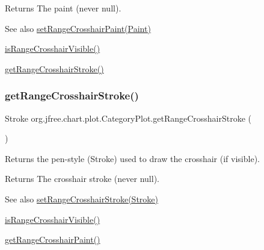 \begin{DoxyReturn}{Returns}
The paint (never {\ttfamily null}).
\end{DoxyReturn}
\begin{DoxySeeAlso}{See also}
\mbox{\hyperlink{classorg_1_1jfree_1_1chart_1_1plot_1_1_category_plot_abc74c7147d75331f023a571f8676e492}{set\+Range\+Crosshair\+Paint(\+Paint)}} 

\mbox{\hyperlink{classorg_1_1jfree_1_1chart_1_1plot_1_1_category_plot_ab7277c96161f03a087953b3313b39c47}{is\+Range\+Crosshair\+Visible()}} 

\mbox{\hyperlink{classorg_1_1jfree_1_1chart_1_1plot_1_1_category_plot_ace9c05d0aebbe5a5a97b1c0572c3ac83}{get\+Range\+Crosshair\+Stroke()}} 
\end{DoxySeeAlso}
\mbox{\label{classorg_1_1jfree_1_1chart_1_1plot_1_1_category_plot_ace9c05d0aebbe5a5a97b1c0572c3ac83}} 
\subsubsection{\texorpdfstring{get\+Range\+Crosshair\+Stroke()}{getRangeCrosshairStroke()}}
{\footnotesize\ttfamily Stroke org.\+jfree.\+chart.\+plot.\+Category\+Plot.\+get\+Range\+Crosshair\+Stroke (\begin{DoxyParamCaption}{ }\end{DoxyParamCaption})}

Returns the pen-\/style ({\ttfamily Stroke}) used to draw the crosshair (if visible).

\begin{DoxyReturn}{Returns}
The crosshair stroke (never {\ttfamily null}).
\end{DoxyReturn}
\begin{DoxySeeAlso}{See also}
\mbox{\hyperlink{classorg_1_1jfree_1_1chart_1_1plot_1_1_category_plot_a10aa9ae7d091bb3c83d7634d1c9696c6}{set\+Range\+Crosshair\+Stroke(\+Stroke)}} 

\mbox{\hyperlink{classorg_1_1jfree_1_1chart_1_1plot_1_1_category_plot_ab7277c96161f03a087953b3313b39c47}{is\+Range\+Crosshair\+Visible()}} 

\mbox{\hyperlink{classorg_1_1jfree_1_1chart_1_1plot_1_1_category_plot_a765b9210a12e1f9374c252a5736a659a}{get\+Range\+Crosshair\+Paint()}} 
\end{DoxySeeAlso}
\mbox{\label{classorg_1_1jfree_1_1chart_1_1plot_1_1_category_plot_a01074b7b04854fda802e06bb5418671b}} 
